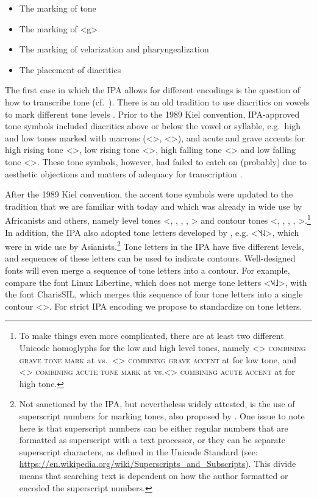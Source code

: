 \begin{itemize}
  \item The marking of tone
  \item The marking of <g>
  \item The marking of velarization and pharyngealization
  \item The placement of diacritics
\end{itemize}

The first case in which the IPA allows for different encodings is the question
of how to transcribe tone (cf.\ \cite{Maddieson1990}). There is an old tradition 
to use diacritics on vowels to mark different tone levels \citep{IPA1949}. Prior to the 1989 Kiel 
convention, IPA-approved tone symbols included diacritics above or below the vowel or syllable, 
e.g.\ high and low tones marked with macrons (<>, <>), and acute and grave 
accents for high rising tone <>, low rising tone <>, high falling tone 
<> and low falling tone <>. These tone symbols, however,  
had failed to catch on (probably) due to aesthetic objections and matters of adequacy for 
transcription \citep[29]{Maddieson1990}.

After the 1989 Kiel convention, the accent tone symbols were updated to the tradition 
that we are familiar with today and which was already in wide use by Africanists and others, 
namely level tones <, , , , > 
and contour tones <, , , , >.\footnote{To make things even more
complicated, there are at least two different Unicode homoglyphs for the low and
high level tones, namely <> \textsc{combining grave tone mark} at
 vs.~<> \textsc{combining grave accent} at  for
low tone, and <> \textsc{combining acute tone mark} at 
vs.<> \textsc{combining acute accent} at  for high tone.} 
In addition, the IPA also adopted tone letters developed by \citet{Chao1930}, e.g. <˥˦˧˨˩>, 
which were in wide use by Asianists.\footnote{Not sanctioned
by the IPA, but nevertheless widely attested, is the use of superscript
numbers for marking tones, also proposed by \citet{Chao1930}. One issue to note here is 
that superscript numbers can be either regular numbers that are formatted as 
superscript with a text processor, or they can be separate superscript characters, 
as defined in the Unicode Standard (see: \url{https://en.wikipedia.org/wiki/Superscripts_and_Subscripts}). 
This divide means that searching text is dependent 
on how the author formatted or encoded the superscript numbers.} 
Tone letters in the IPA have five different levels,
and sequences of these letters can be used to indicate contours. Well-designed
fonts will even merge a sequence of tone letters into a contour. For example,
compare the font Linux Libertine, which does not merge tone letters
<{˥˨˧˩}>, with the font CharisSIL, which merges this
sequence of four tone letters into a single contour <>. For strict
IPA encoding we propose to standardize on tone letters.

